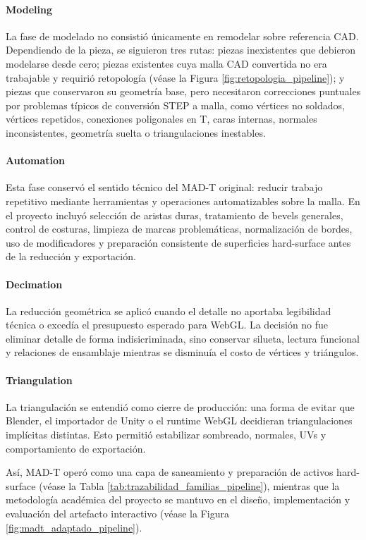 \paragraph{Modeling} La fase de modelado no consistió únicamente en remodelar sobre referencia CAD. Dependiendo de la pieza, se siguieron tres rutas: piezas inexistentes que debieron modelarse desde cero; piezas existentes cuya malla CAD convertida no era trabajable y requirió retopología (véase la Figura \ref{fig:retopologia_pipeline}); y piezas que conservaron su geometría base, pero necesitaron correcciones puntuales por problemas típicos de conversión STEP a malla, como vértices no soldados, vértices repetidos, conexiones poligonales en T, caras internas, normales inconsistentes, geometría suelta o triangulaciones inestables.

\paragraph{Automation} Esta fase conservó el sentido técnico del MAD-T original: reducir trabajo repetitivo mediante herramientas y operaciones automatizables sobre la malla. En el proyecto incluyó selección de aristas duras, tratamiento de bevels generales, control de costuras, limpieza de marcas problemáticas, normalización de bordes, uso de modificadores y preparación consistente de superficies hard-surface antes de la reducción y exportación.

\paragraph{Decimation} La reducción geométrica se aplicó cuando el detalle no aportaba legibilidad técnica o excedía el presupuesto esperado para WebGL. La decisión no fue eliminar detalle de forma indisicriminada, sino conservar silueta, lectura funcional y relaciones de ensamblaje mientras se disminuía el costo de vértices y triángulos.

\paragraph{Triangulation} La triangulación se entendió como cierre de producción: una forma de evitar que Blender, el importador de Unity o el runtime WebGL decidieran triangulaciones implícitas distintas. Esto permitió estabilizar sombreado, normales, UVs y comportamiento de exportación.

Así, MAD-T operó como una capa de saneamiento y preparación de activos hard-surface (véase la Tabla \ref{tab:trazabilidad_familias_pipeline}), mientras que la metodología académica del proyecto se mantuvo en el diseño, implementación y evaluación del artefacto interactivo (véase la Figura \ref{fig:madt_adaptado_pipeline}).

